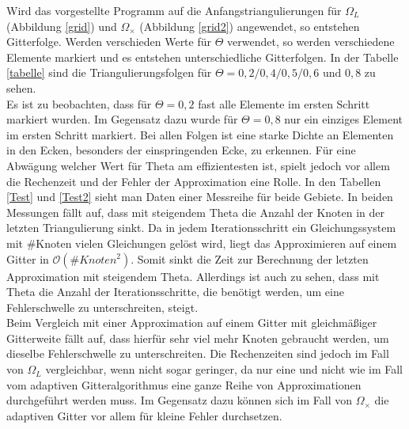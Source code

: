 Wird das vorgestellte \matlab \:Programm auf die Anfangstriangulierungen für $\Omega_L$ (Abbildung \ref{grid}) und $\Omega_\times$ (Abbildung \ref{grid2}) angewendet, so entstehen Gitterfolge. Werden verschieden Werte für $\Theta$ verwendet, so werden verschiedene Elemente markiert und es entstehen unterschiedliche Gitterfolgen. In der Tabelle \ref{tabelle} sind die Triangulierungsfolgen für $\Theta =0,2/0,4/0,5/0,6 \text{ und } 0,8$ zu sehen. \\
Es ist zu beobachten, dass für $\Theta = 0,2$ fast alle Elemente im ersten Schritt markiert wurden. Im Gegensatz dazu wurde für $\Theta = 0,8$ nur ein einziges Element im ersten Schritt markiert. Bei allen Folgen ist eine starke Dichte an Elementen in den Ecken, besonders der einspringenden Ecke, zu erkennen. Für eine Abwägung welcher Wert für Theta am effizientesten ist, spielt jedoch vor allem die Rechenzeit und der Fehler der Approximation eine Rolle. In den Tabellen \ref{Test} und \ref{Test2} sieht man Daten einer Messreihe für beide Gebiete. In beiden Messungen fällt auf, dass mit steigendem Theta die Anzahl der Knoten in der letzten Triangulierung sinkt. Da in jedem Iterationsschritt ein Gleichungssystem mit \#Knoten vielen Gleichungen gelöst wird, liegt das Approximieren auf einem Gitter in $\mathcal{O}(\#Knoten^2)$. Somit sinkt die Zeit zur Berechnung der letzten Approximation mit steigendem Theta. Allerdings ist auch zu sehen, dass mit Theta die Anzahl der Iterationsschritte, die benötigt werden, um eine Fehlerschwelle zu unterschreiten, steigt.\\
Beim Vergleich mit einer Approximation auf einem Gitter mit gleichmäßiger Gitterweite fällt auf, dass hierfür sehr viel mehr Knoten gebraucht werden, um dieselbe Fehlerschwelle zu unterschreiten. Die Rechenzeiten sind jedoch im Fall von $\Omega_L$ vergleichbar, wenn nicht sogar geringer, da nur eine und nicht wie im Fall vom adaptiven Gitteralgorithmus eine ganze Reihe von Approximationen durchgeführt werden muss. Im Gegensatz dazu können sich im Fall von $\Omega_\times$ die adaptiven Gitter vor allem für kleine Fehler durchsetzen.\\




